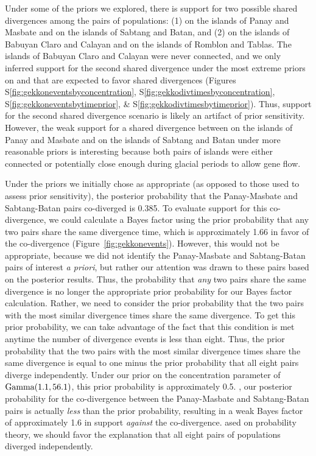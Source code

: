 Under some of the priors we explored, there is support for two possible shared
divergences among the pairs of  populations:
(1)
 on the islands of Panay and Masbate
and
 on the islands of Sabtang and Batan,
and (2)
on the islands of Babuyan Claro and Calayan
and
 on the islands of Romblon and Tablas.
The islands of Babuyan Claro and Calayan were never connected,
and we only inferred support for the second shared divergence
under the most extreme priors on \concentration and
\divtime that are expected to favor shared divergences
(Figures
S\ref{fig:gekkoneventsbyconcentration},
S\ref{fig:gekkodivtimesbyconcentration},
S\ref{fig:gekkoneventsbytimeprior},
\&
S\ref{fig:gekkodivtimesbytimeprior}).
Thus, support for the second shared divergence scenario is likely an
artifact of prior sensitivity.
However, the weak support for a shared divergence between
 on the islands of Panay and Masbate
and
 on the islands of Sabtang and Batan
under more reasonable priors is interesting because both pairs of islands were
either connected or potentially close enough during glacial periods to allow
gene flow.

Under the priors we initially chose as appropriate (as opposed to those used to
assess prior sensitivity), the posterior probability that the Panay-Masbate and
Sabtang-Batan pairs co-diverged is 0.385.
To evaluate support for this co-divergence, we could calculate a Bayes factor
using the prior probability that any two pairs share the same divergence time,
which is approximately 1.66 in favor of the co-divergence
(Figure~\ref{fig:gekkonevents}).
However, this would not be appropriate, because we did not identify the
Panay-Masbate and Sabtang-Batan pairs of interest \emph{a priori},
but rather our attention was drawn to these pairs based on the posterior
results.
Thus, the probability that \emph{any} two pairs share the same divergence
is no longer the appropriate prior probability for our Bayes factor calculation.
Rather, we need to consider the prior probability that the two pairs with
the most similar divergence times share the same divergence.
To get this prior probability, we can take advantage of the fact that this
condition is met anytime the number of divergence events is less than eight.
Thus, the prior probability that the two pairs with the most similar divergence
times share the same divergence is equal to one minus the prior probability
that all eight pairs diverge independently.
Under our prior on the concentration parameter of $\textrm{Gamma}(1.1, 56.1)$,
this prior probability is approximately 0.5.
, our posterior probability for the co-divergence between the Panay-Masbate
and Sabtang-Batan pairs is actually \emph{less} than the prior probability,
resulting in a weak Bayes factor of approximately 1.6 in support \emph{against}
the co-divergence.
ased on probability theory, we should favor the explanation that all
eight pairs of  populations diverged independently.

